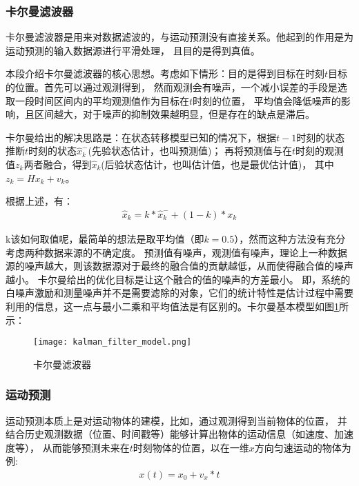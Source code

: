 \subsubsection{卡尔曼滤波器}
卡尔曼滤波器\cite{welch1995introduction}是用来对数据滤波的，与运动预测没有直接关系。他起到的作用是为运动预测的输入数据源进行平滑处理，
且目的是得到真值。\par

本段介绍卡尔曼滤波器的核心思想。考虑如下情形：目的是得到目标在时刻$t$目标的位置。首先可以通过观测得到，
然而观测会有噪声，一个减小误差的手段是选取一段时间区间内的平均观测值作为目标在$t$时刻的位置，
平均值会降低噪声的影响，且区间越大，对于噪声的抑制效果越明显，但是存在的缺点是滞后。\par

卡尔曼给出的解决思路是：在状态转移模型已知的情况下，根据$t-1$时刻的状态推断$t$时刻的状态$\hat{x}_k^{-}$(先验状态估计，也叫预测值)；
再将预测值与在$t$时刻的观测值$z_k$两者融合，得到$\hat{x}_k$(后验状态估计，也叫估计值，也是最优估计值)，
其中$z_k=Hx_k+v_k$。\par

根据上述，有：
\begin{gather}
    \hat{x}_k = k*\hat{x}_k^{-} + (1-k)*x_k
\end{gather}

k该如何取值呢，最简单的想法是取平均值（即$k=0.5$），然而这种方法没有充分考虑两种数据来源的不确定度。
预测值有噪声，观测值有噪声，理论上一种数据源的噪声越大，则该数据源对于最终的融合值的贡献越低，从而使得融合值的噪声越小。
卡尔曼给出的优化目标是让这个融合的值的噪声的方差最小。
即，系统的白噪声激励和测量噪声并不是需要滤除的对象，它们的统计特性是估计过程中需要利用的信息，这一点与最小二乘和平均值法是有区别的。卡尔曼基本模型如图\ref{卡尔曼滤波器}所示：
\begin{figure}[H]
    \centering
    \texttt{[image: kalman\_filter\_model.png]} 
    \caption{卡尔曼滤波器} 
    \label{卡尔曼滤波器} 
\end{figure} 

\subsubsection{运动预测}


运动预测本质上是对运动物体的建模，比如，通过观测得到当前物体的位置，
并结合历史观测数据（位置、时间戳等）能够计算出物体的运动信息（如速度、加速度等），
从而能够预测未来在$t$时刻物体的位置，以在一维$x$方向匀速运动的物体为例: 
\begin{gather}
    x(t) = x_0 + v_x*t
\end{gather}

